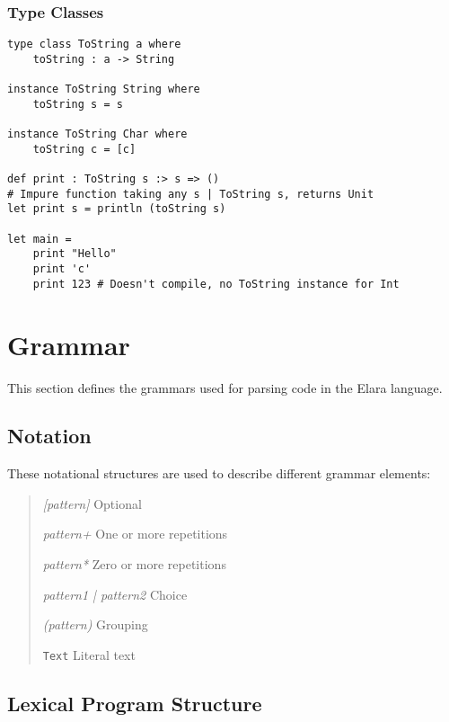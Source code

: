 \documentclass{article}
\begin{document}
\subsubsection{Type Classes}
\begin{verbatim}
type class ToString a where
    toString : a -> String

instance ToString String where
    toString s = s

instance ToString Char where
    toString c = [c]

def print : ToString s :> s => () 
# Impure function taking any s | ToString s, returns Unit
let print s = println (toString s)

let main = 
    print "Hello"
    print 'c'
    print 123 # Doesn't compile, no ToString instance for Int

\end{verbatim}
\section{Grammar}
This section defines the grammars used for parsing code in the Elara language.

\subsection{Notation}
These notational structures are used to describe different grammar elements:
\begin{quote}
    \begin{description}
        \textit{[pattern]} Optional

        \textit{pattern+} One or more repetitions

        \textit{pattern*} Zero or more repetitions

        \textit{pattern1 | pattern2} Choice

        \textit{(pattern)} Grouping

        \verb=Text= Literal text

    \end{description}
\end{quote}
\subsection{Lexical Program Structure}
\end{document}
